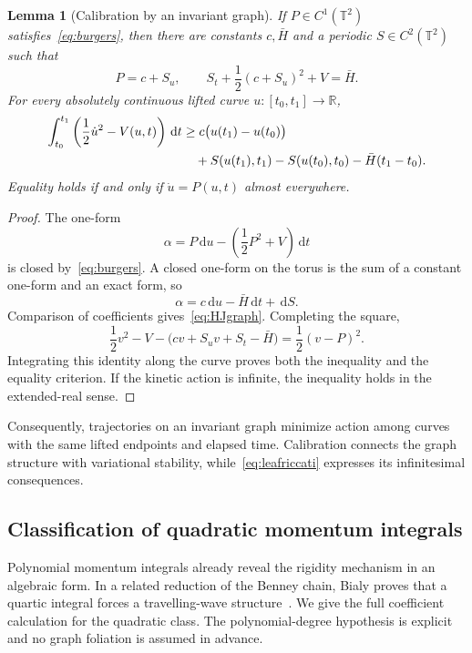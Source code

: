 \documentclass[review,12pt,times,a4paper,nopreprintline]{elsarticle}
\theoremstyle{plain}
\newtheorem{lemma}[theorem]{Lemma}
\theoremstyle{definition}
\theoremstyle{remark}
\newcommand{\T}{\mathbb T}
\newcommand{\R}{\mathbb R}
\newcommand{\dd}{\,\mathrm d}
\numberwithin{equation}{section}
\begin{document}
\begin{lemma}[Calibration by an invariant graph]\label{lem:calibration}
If $P\in C^1(\T^2)$ satisfies~\eqref{eq:burgers}, then there are constants $c,\bar H$ and a periodic $S\in C^2(\T^2)$ such that
\begin{equation}\label{eq:HJgraph}
 P=c+S_u,\qquad S_t+\frac12(c+S_u)^2+V=\bar H.
\end{equation}
For every absolutely continuous lifted curve $u:[t_0,t_1]\to\R$,
\begin{align}\label{eq:calibration}
 \int_{t_0}^{t_1}\left(\frac12\dot u^2-V(u,t)\right)\dd t
 &\geq c\bigl(u(t_1)-u(t_0)\bigr)\notag\\
 &\quad+S(u(t_1),t_1)-S(u(t_0),t_0)
       -\bar H(t_1-t_0).
\end{align}
Equality holds if and only if $\dot u=P(u,t)$ almost everywhere.
\end{lemma}
\begin{proof}
The one-form
\[
 \alpha=P\dd u-\left(\frac12P^2+V\right)\dd t
\]
is closed by~\eqref{eq:burgers}. A closed one-form on the torus is the sum of a constant one-form and an exact form, so
\[
 \alpha=c\dd u-\bar H\dd t+\dd S.
\]
Comparison of coefficients gives~\eqref{eq:HJgraph}. Completing the square,
\[
 \frac12v^2-V-\bigl(cv+S_uv+S_t-\bar H\bigr)=\frac12(v-P)^2.
\]
Integrating this identity along the curve proves both the inequality and the equality criterion. If the kinetic action is infinite, the inequality holds in the extended-real sense.
\end{proof}

Consequently, trajectories on an invariant graph minimize action among curves with the same lifted endpoints and elapsed time. Calibration connects the graph structure with variational stability, while~\eqref{eq:leafriccati} expresses its infinitesimal consequences.

\subsection{Classification of quadratic momentum integrals}
Polynomial momentum integrals already reveal the rigidity mechanism in an algebraic form. In a related reduction of the Benney chain, Bialy proves that a quartic integral forces a travelling-wave structure~\cite{BialyBenney}. We give the full coefficient calculation for the quadratic class. The polynomial-degree hypothesis is explicit and no graph foliation is assumed in advance.
\end{document}

